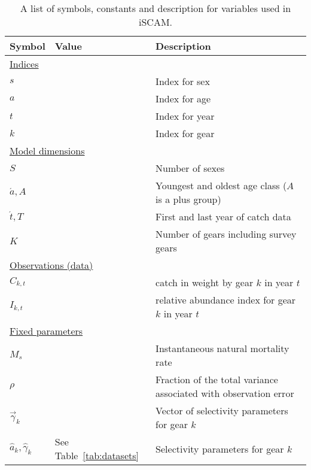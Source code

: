 \clearpage

\newp
\begin{table}[b]
\centering
\caption{\label{tab:variables} A list of symbols, constants and description for variables used in iSCAM.}
\begin{tabular}{lll}
\hline
\bf{Symbol} & \bf{Value} & \bf{Description} \\
\hline
%
\multicolumn{3}{l}{\underline{Indices}}\\
$s$ & & Index for sex\\
$a$ & & Index for age\\
$t$ & & Index for year\\
$k$ & & Index for gear\\
\multicolumn{3}{l}{\underline{Model dimensions}}\\
$S$             & & Number of sexes\\
$\acute{a}, A$  & & Youngest and oldest age class ($A$ is a plus group)\\
$\acute{t}, T$  & & First and last year of catch data\\
$K$             & & Number of gears including survey gears\\
\multicolumn{3}{l}{\underline{Observations (data)}}\\
$C_{k,t}$        & & catch in weight by gear $k$ in year $t$\\
$I_{k,t}$        & & relative abundance index for gear $k$ in year $t$\\
\multicolumn{3}{l}{\underline{Fixed parameters}}\\
$M_s$           & & Instantaneous natural mortality rate \\
$\rho$          & & Fraction of the total variance associated with observation error\\
$\vec{\gamma}_k$ & & Vector of selectivity parameters for gear $k$ \\
$\hat{a}_k, \hat{\gamma}_k$    &See Table~\ref{tab:datasets} & Selectivity parameters for gear $k$ \\

\end{tabular}
\end{table}
